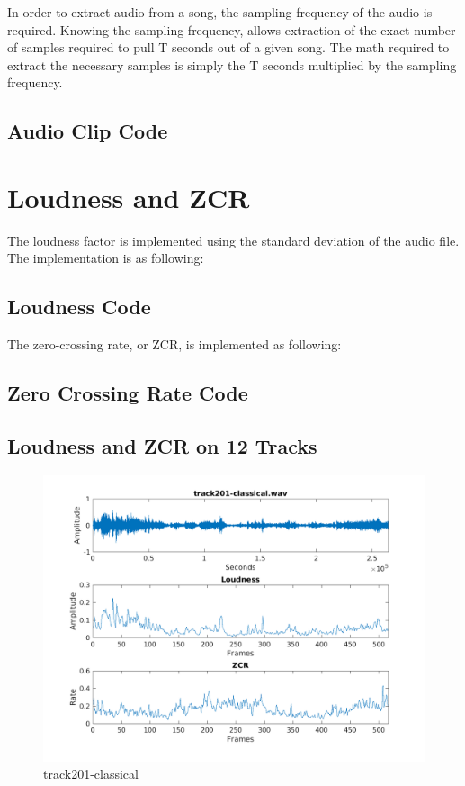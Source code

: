 \documentclass[11pt, a4paper]{article}
\begin{document}
In order to extract audio from a song, the sampling frequency of the audio is required. Knowing the sampling frequency, allows extraction of the exact number of samples required to pull T seconds out of a given song. The math required to extract the necessary samples is simply the T seconds multiplied by the sampling frequency. 

\subsection{Audio Clip Code}


\section{Loudness and ZCR}

The loudness factor is implemented using the standard deviation of the audio file. The implementation is as following:

\subsection{Loudness Code}
 

The zero-crossing rate, or ZCR, is implemented as following:

\subsection{Zero Crossing Rate Code}
 

\subsection{Loudness and ZCR on 12 Tracks}

\begin{figure}[H]
    \centering
    \includegraphics[width=.8\textwidth]{track201-classical-timedomain.png}
    \caption{track201-classical}
\end{figure}
\end{document}
